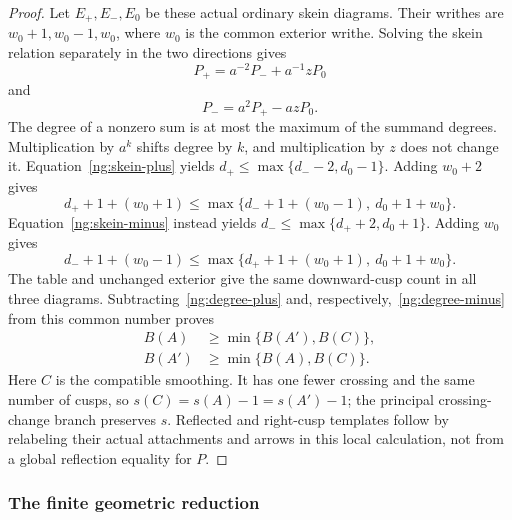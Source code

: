 \begin{proof}
Let $E_+,E_-,E_0$ be these actual ordinary skein diagrams. Their writhes
are $w_0+1,w_0-1,w_0$, where $w_0$ is the common exterior writhe.
Solving the skein relation separately in the two directions gives
\begin{equation}\label{ng:skein-plus}
 P_+=a^{-2}P_-+a^{-1}zP_0
\end{equation}
and
\begin{equation}\label{ng:skein-minus}
 P_-=a^2P_+-azP_0.
\end{equation}
The degree of a nonzero sum is at most the maximum of the summand
degrees. Multiplication by $a^k$ shifts degree by $k$, and multiplication
by $z$ does not change it. Equation~\eqref{ng:skein-plus} yields
$d_+\leq\max\{d_--2,d_0-1\}$. Adding $w_0+2$ gives
\begin{equation}\label{ng:degree-plus}
 d_++1+(w_0+1)
 \leq\max\{d_-+1+(w_0-1),\ d_0+1+w_0\}.
\end{equation}
Equation~\eqref{ng:skein-minus} instead yields
$d_-\leq\max\{d_++2,d_0+1\}$. Adding $w_0$ gives
\begin{equation}\label{ng:degree-minus}
 d_-+1+(w_0-1)
 \leq\max\{d_++1+(w_0+1),\ d_0+1+w_0\}.
\end{equation}
The table and unchanged exterior give the same downward-cusp count
in all three diagrams. Subtracting~\eqref{ng:degree-plus} and,
respectively,~\eqref{ng:degree-minus} from this common number proves
\begin{equation}\label{ng:skein-defect}
 \begin{aligned}
 B(A)&\geq\min\{B(A'),B(C)\},\\
 B(A')&\geq\min\{B(A),B(C)\}.
 \end{aligned}
\end{equation}
Here $C$ is the compatible smoothing. It has one fewer crossing and
the same number of cusps, so $s(C)=s(A)-1=s(A')-1$; the principal
crossing-change branch preserves $s$. Reflected and right-cusp templates
follow by relabeling their actual attachments and arrows in this local
calculation, not from a global reflection equality for $P$.
\end{proof}

\subsubsection{The finite geometric reduction}
\label{ng:word-section}

